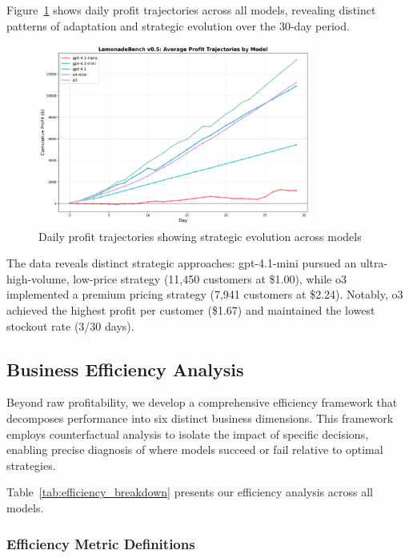 \documentclass[11pt]{article}
\begin{document}


Figure~\ref{fig:profit_trajectories} shows daily profit trajectories across all models, revealing distinct patterns of adaptation and strategic evolution over the 30-day period.

\begin{figure}[h]
\centering
\includegraphics[width=0.8\textwidth]{plots/average_profit_trajectories.png}
\caption{Daily profit trajectories showing strategic evolution across models}
\label{fig:profit_trajectories}
\end{figure}

The data reveals distinct strategic approaches: gpt-4.1-mini pursued an ultra-high-volume, low-price strategy (11,450 customers at \$1.00), while o3 implemented a premium pricing strategy (7,941 customers at \$2.24). Notably, o3 achieved the highest profit per customer (\$1.67) and maintained the lowest stockout rate (3/30 days).

\subsection{Business Efficiency Analysis}

Beyond raw profitability, we develop a comprehensive efficiency framework that decomposes performance into six distinct business dimensions. This framework employs counterfactual analysis to isolate the impact of specific decisions, enabling precise diagnosis of where models succeed or fail relative to optimal strategies.

Table~\ref{tab:efficiency_breakdown} presents our efficiency analysis across all models.



\subsubsection{Efficiency Metric Definitions}
\end{document}

